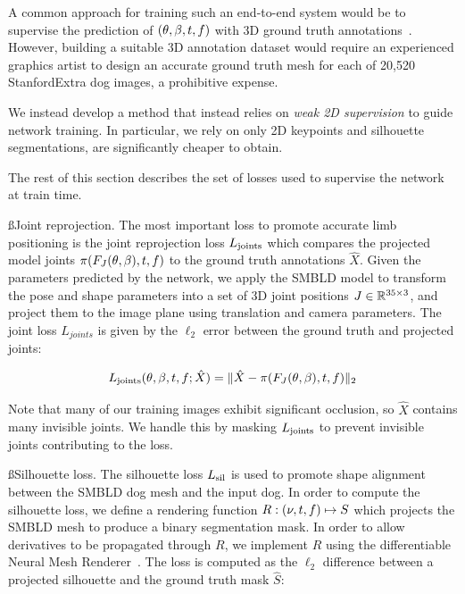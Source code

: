 A common approach for training such an end-to-end system would be to supervise the prediction of $(\theta, \beta, t, f)$ with 3D ground truth annotations~\cite{kolotouros19learning,kanazawa18end-to-end,pavlakos18learning}. However, building a suitable 3D annotation dataset would require an experienced graphics artist to design an accurate ground truth mesh for each of 20,520 StanfordExtra dog images, a prohibitive expense.


We instead develop a method that instead relies on \emph{weak 2D supervision} to guide network training. In particular, we rely on only 2D keypoints and silhouette segmentations, are significantly cheaper to obtain.

The rest of this section describes the set of losses used to supervise the network at train time.

\ss{Joint reprojection.}
The most important loss to promote accurate limb positioning is the joint reprojection loss $L_{\textrm{joints}}$ which compares the projected model joints $\pi(F_{J}(\theta, \beta), t, f)$ to the ground truth annotations $\hat{X}$. Given the parameters predicted by the network, we apply the SMBLD model to transform the pose and shape parameters into a set of 3D joint positions $J \in {\mathbb{R}^{35 \times 3}}$, and project them to the image plane using translation and camera parameters. The joint loss $L_{joints}$ is given by the $\ell_2$ error between the ground truth and projected joints:

\begin{equation}
L_{\textrm{joints}}(\theta, \beta, t, f; \hat{X}) = \lVert \hat{X} - \pi(F_{J}(\theta, \beta), t, f) \rVert_{2}
\end{equation}

Note that many of our training images exhibit significant occlusion, so $\hat{X}$ contains many invisible joints. We handle this by masking $L_{\textrm{joints}}$ to prevent invisible joints contributing to the loss.

\ss{Silhouette loss.}
The silhouette loss $L_{\textrm{sil}}$ is used to promote shape alignment between the SMBLD dog mesh and the input dog. In order to compute the silhouette loss, we define a rendering function $R: (\nu, t, f) \mapsto S$ which projects the SMBLD mesh to produce a binary segmentation mask. In order to allow derivatives to be propagated through $R$, we implement $R$ using the differentiable Neural Mesh Renderer~\cite{kato2018renderer}. The loss is computed as the $\ell_2$ difference between a projected silhouette and the ground truth mask $\hat{S}$:

